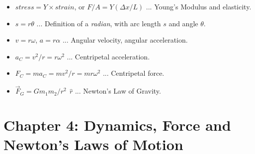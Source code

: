 \documentclass[10pt]{article}
\begin{document}
\begin{itemize}
\item $stress = Y \times strain$, or $F/A = Y (\Delta x / L)$ ... Young's Modulus and elasticity.
\item $s = r \theta$ ... Definition of a \textit{radian}, with arc length $s$ and angle $\theta$.
\item $v = r\omega$, $a = r\alpha$ ... Angular velocity, angular acceleration.
\item $a_C = v^2/r = r\omega^2$ ... Centripetal acceleration.
\item $F_C = m a_C = mv^2/r = mr\omega^2$ ... Centripetal force.
\item $\vec{F}_G = G m_1 m_2/r^2 ~~ \hat{r}$ ... Newton's Law of Gravity.
\end{itemize}

\section{Chapter 4: Dynamics, Force and Newton's Laws of Motion}
\end{document}

